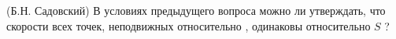 (Б.Н. Садовский)
В условиях предыдущего вопроса можно ли утверждать, что скорости
всех точек, неподвижных относительно  , одинаковы относительно $S$ ?
